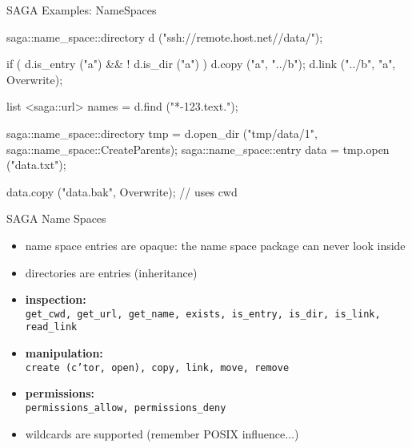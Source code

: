 \documentclass[%
  pdf,
  colorBG,
  slideColor,
  frames,
  ogf
]{prosper}
\newcommand{\T}[1]{\texttt{#1}}
\newcommand{\B}[1]{\textbf{#1}}
\begin{document}


 \begin{slide}{SAGA Examples: NameSpaces}

  \begin{mycode}[label=name space management]

  saga::name_space::directory d ("ssh://remote.host.net//data/");

  if ( d.is_entry ("a") && ! d.is_dir ("a") )
  {
    d.copy ("a", "../b");
    d.link ("../b", "a", Overwrite);
  }

  list <saga::url> names = d.find ("*-{123}.text.");

  saga::name_space::directory tmp  = d.open_dir ("tmp/data/1", 
                              saga::name_space::CreateParents);
  saga::name_space::entry     data = tmp.open   ("data.txt");

  data.copy ("data.bak", Overwrite);     // uses cwd

  \end{mycode}
   
 \end{slide}


 \begin{slide}{SAGA Name Spaces}

  \begin{itemize}
   \item name space entries are opaque: the name space package
   can never look inside
   \item directories are entries (inheritance)

   \item \B{inspection:}\\ \T{get\_cwd, get\_url, get\_name, exists, is\_entry,
   is\_dir, is\_link, read\_link}

   \item \B{manipulation:}\\ \T{create (c'tor, open), copy, link,
   move, remove} 

   \item \B{permissions:}\\ \T{permissions\_allow, permissions\_deny}

   \item wildcards are supported (remember POSIX influence...)

  \end{itemize}
   
 \end{slide}
\end{document}
